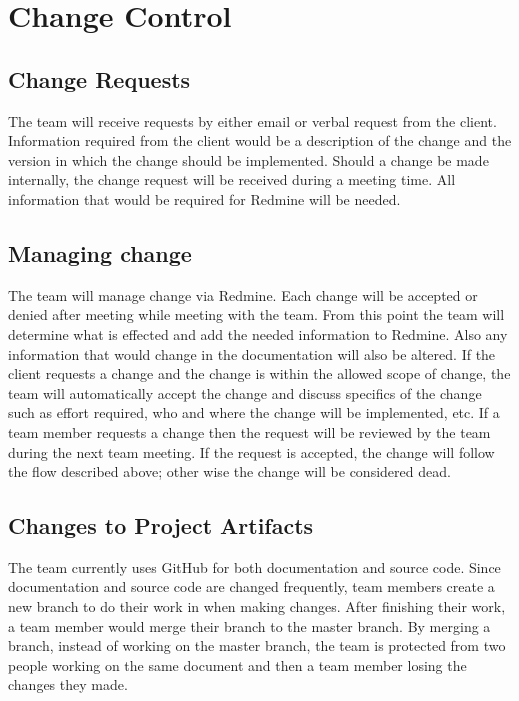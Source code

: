 \section{Change Control}
\subsection{Change Requests}
The team will receive requests by either email or verbal request from the client.  Information required from the client would be a description of the change and the version in which the change should be implemented.  Should a change be made internally, the change request will be received during a meeting time.  All information that would be required for Redmine will be needed.

\subsection{Managing change}
The team will manage change via Redmine.  Each change will be accepted or denied after meeting while meeting with the team.  From this point the team will determine what is effected and add the needed information to Redmine.  Also any information that would change in the documentation will also be altered.  If the client requests a change and the change is within the allowed scope of change, the team will automatically accept the change and discuss specifics of the change such as effort required, who and where the change will be implemented, etc. If a team member requests a change then the request will be reviewed by the team during the next team meeting.  If the request is accepted, the change will follow the flow described above; other wise the change will be considered dead.

\subsection{Changes to Project Artifacts}
The team currently uses GitHub for both documentation and source code.  Since documentation and source code are changed frequently, team members create a new branch to do their work in when making changes.  After finishing their work, a team member would merge their branch to the master branch.  By merging a branch, instead of working on the master branch, the team is protected from two people working on the same document and then a team member losing the changes they made.
